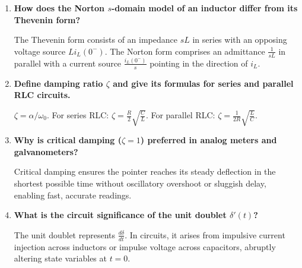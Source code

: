 \documentclass[12pt,a4paper]{article}
\newcommand{\Q}[1]{\textbf{#1}\par\noindent\ignorespaces}
\begin{document}
\begin{tcolorbox}[exambox, title={\textbf{Frequently Asked / Viva Questions}}]
\begin{enumerate}[topsep=0pt, label=\textbf{Q\arabic*.}, itemsep=4pt]
  \item \Q{How does the Norton $s$-domain model of an inductor differ from its Thevenin form?}
  The Thevenin form consists of an impedance $sL$ in series with an opposing voltage source $L i_L(0^-)$. The Norton form comprises an admittance $\frac{1}{sL}$ in parallel with a current source $\frac{i_L(0^-)}{s}$ pointing in the direction of $i_L$.

  \item \Q{Define damping ratio $\zeta$ and give its formulas for series and parallel RLC circuits.}
  $\zeta = \alpha / \omega_0$. For series RLC: $\zeta = \frac{R}{2}\sqrt{\frac{C}{L}}$. For parallel RLC: $\zeta = \frac{1}{2R}\sqrt{\frac{L}{C}}$.

  \item \Q{Why is critical damping ($\zeta = 1$) preferred in analog meters and galvanometers?}
  Critical damping ensures the pointer reaches its steady deflection in the shortest possible time without oscillatory overshoot or sluggish delay, enabling fast, accurate readings.

  \item \Q{What is the circuit significance of the unit doublet $\delta'(t)$?}
  The unit doublet represents $\frac{d\delta}{dt}$. In circuits, it arises from impulsive current injection across inductors or impulse voltage across capacitors, abruptly altering state variables at $t=0$.
\end{enumerate}
\end{tcolorbox}
\end{document}
